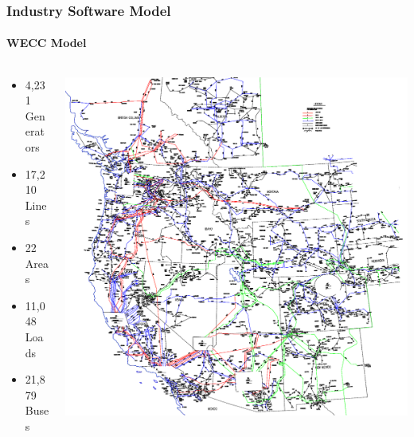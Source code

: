 \documentclass[14pt, unknownkeysallowed]{beamer}
\begin{document}
\begin{frame}
\frametitle{Industry Software Model}
\framesubtitle{WECC Model}
\begin{columns}
\begin{column}{0.45\textwidth}
   \begin{itemize}
   	\item 4,231 Generators
   	\item 17,210 Lines
 	\item 22 Areas
   	\item 11,048 Loads
	\item 21,879 Buses
\end{itemize}
\end{column}
\begin{column}{0.5\textwidth}
{\tiny \cite{MTlegReport} }
\includegraphics[height=.8\textheight]{WECCauto}  %
\end{column}
\end{columns}
\end{frame}

\end{document}
